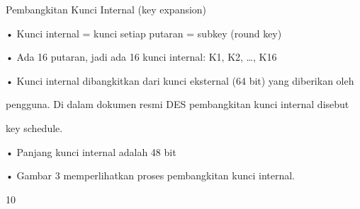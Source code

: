 \documentclass{article}
\begin{document}

Pembangkitan Kunci Internal (key expansion)

• Kunci internal = kunci setiap putaran = subkey (round key)

• Ada 16 putaran, jadi ada 16 kunci internal: K1, K2, …, K16 

• Kunci internal dibangkitkan dari kunci eksternal (64 bit) yang diberikan oleh 

pengguna.  Di dalam dokumen resmi DES pembangkitan kunci internal disebut 

key schedule.

• Panjang kunci internal adalah 48 bit

• Gambar 3 memperlihatkan proses pembangkitan kunci internal.

10
\end{document}
